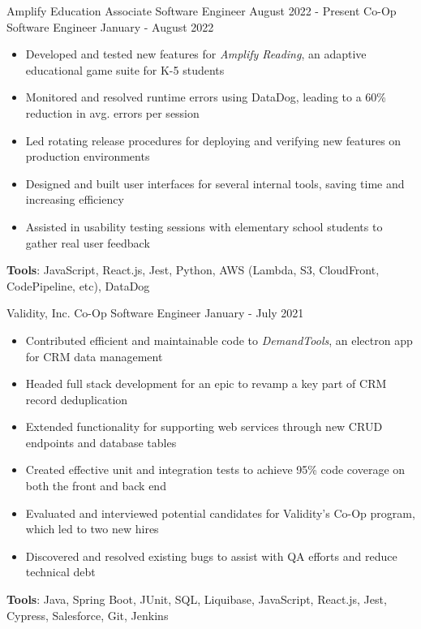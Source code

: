 \documentclass{awesome-cv}
\begin{document}
		\vspace{-0.2cm}

		\begin{cventries}
			\vspace{-0.15cm}
			\cventryC
				{Amplify Education}
				{Associate Software Engineer}
				{August 2022 - Present}
				{Co-Op Software Engineer}
				{January - August 2022}
				{}
				{
					\vspace{-0.3cm}
					\begin{itemize}[nosep]
						\item Developed and tested new features for \textit{Amplify Reading}, an adaptive educational game suite for K-5 students
						\item Monitored and resolved runtime errors using DataDog, leading to a 60\% reduction in avg. errors per session
						\item Led rotating release procedures for deploying and verifying new features on production environments
						\item Designed and built user interfaces for several internal tools, saving time and increasing efficiency
						\item Assisted in usability testing sessions with elementary school students to gather real user feedback
					\end{itemize}
					\vspace{0.2cm}
					\qquad \textbf{Tools}: JavaScript, React.js, Jest, Python, AWS (Lambda, S3, CloudFront, CodePipeline, etc), DataDog
				}

			\cventry
				{Validity, Inc.}
				{Co-Op Software Engineer}
				{January - July 2021}
				{}
				{
					\vspace{-0.3cm}
					\begin{itemize}[nosep]
						\item Contributed efficient and maintainable code to \textit{DemandTools}, an electron app for CRM data management
						\item Headed full stack development for an epic to revamp a key part of CRM record deduplication
						\item Extended functionality for supporting web services through new CRUD endpoints and database tables
						\item Created effective unit and integration tests to achieve 95\% code coverage on both the front and back end
						\item Evaluated and interviewed potential candidates for Validity's Co-Op program, which led to two new hires
						\item Discovered and resolved existing bugs to assist with QA efforts and reduce technical debt
					\end{itemize}
					\vspace{0.2cm}
					\qquad \textbf{Tools}: Java, Spring Boot, JUnit, SQL, Liquibase, JavaScript, React.js, Jest, Cypress, Salesforce, Git, Jenkins
				}
		\end{cventries}
		\vspace{-0.1cm}
\end{document}
